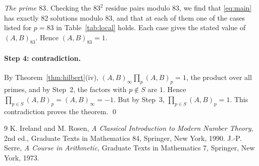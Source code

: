 \documentclass[11pt]{article}
\begin{document}
\emph{The prime $83$.} Checking the $83^2$ residue pairs modulo $83$, we find that \eqref{eq:main} has exactly 82 solutions modulo $83$, and that at each of them one of the cases listed for $p=83$ in Table~\ref{tab:local} holds. Each case gives the stated value of $(A,B)_{83}$. Hence $(A,B)_{83}=1$.

\paragraph{Step 4: contradiction.} By Theorem~\ref{thm:hilbert}(iv), $(A,B)_\infty\prod_p(A,B)_p=1$, the product over all primes, and by Step~2, the factors with $p\notin S$ are $1$. Hence $\prod_{p\in S}(A,B)_p=(A,B)_\infty=-1$. But by Step~3, $\prod_{p\in S}(A,B)_p=1$. This contradiction proves the theorem.
\qed

\begin{thebibliography}{9}
 K. Ireland and M. Rosen, \emph{A Classical Introduction to Modern Number Theory}, 2nd ed., Graduate Texts in Mathematics 84, Springer, New York, 1990.
 J.-P. Serre, \emph{A Course in Arithmetic}, Graduate Texts in Mathematics 7, Springer, New York, 1973.
\end{thebibliography}
\end{document}
